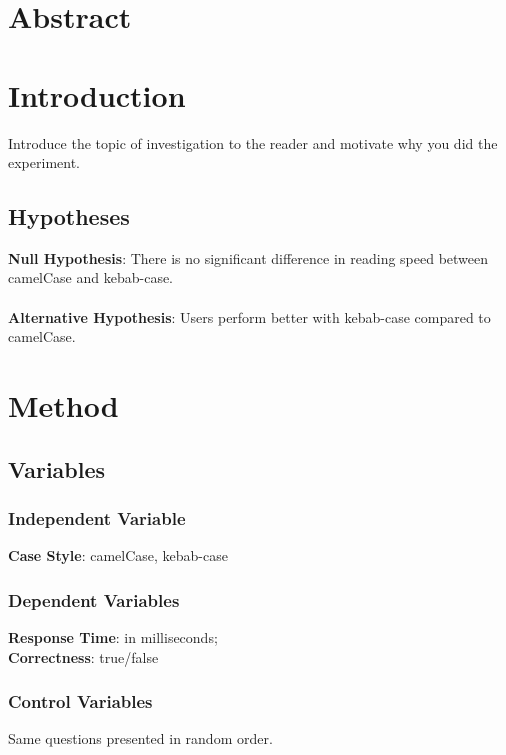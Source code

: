 \documentclass[unicode,11pt,a4paper,oneside,numbers=endperiod,openany]{scrartcl}
\begin{document}
\setassignment
{}

\newline


\section{Abstract}
 

\section{Introduction}

Introduce the topic of investigation to the reader and motivate why you did the experiment.

\subsection{Hypotheses}
\textbf{Null Hypothesis}: There is no significant difference in reading speed between camelCase and kebab-case. \\
\hfill \\
\textbf{Alternative Hypothesis}: Users perform better with kebab-case compared to camelCase.

\section{Method}

\subsection{Variables}
\subsubsection{Independent Variable} 
\textbf{Case Style}: camelCase, kebab-case

\subsubsection{Dependent Variables}
\textbf{Response Time}: in milliseconds; \\
\textbf{Correctness}: true/false

\subsubsection{Control Variables}
Same questions presented in random order.
\end{document}
